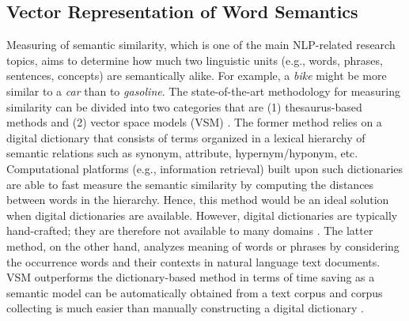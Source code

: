 \documentclass[Journal,InsideFigs, DoubleSpace]{ascelike} %
\begin{document}
\subsection{Vector Representation of Word Semantics}
Measuring of semantic similarity, which is one of the main NLP-related research topics, aims to determine how much two linguistic units (e.g., words, phrases, sentences, concepts) are semantically alike. For example, a \textit{bike} might be more similar to a \textit{car} than to \textit{gasoline}. The state-of-the-art methodology for measuring similarity can be divided into two categories that are (1) thesaurus-based methods and (2) vector space models (VSM) \cite{harispe13}. The former method relies on a digital dictionary that consists of terms organized in a lexical hierarchy of semantic relations such as synonym, attribute, hypernym/hyponym, etc. Computational platforms (e.g., information retrieval) built upon such dictionaries are able to fast measure the semantic similarity by computing the distances between words in the hierarchy. Hence, this method would be an ideal solution when digital dictionaries are available. However, digital dictionaries are typically hand-crafted; they are therefore not available to many domains \cite{kolb08}. The latter method, on the other hand, analyzes meaning of words or phrases by considering the occurrence words and their contexts in natural language text documents. VSM outperforms the dictionary-based method in terms of time saving as a semantic model can be automatically obtained from a text corpus and corpus collecting is much easier than manually constructing a digital dictionary \cite{turney10}.
%
\end{document}
